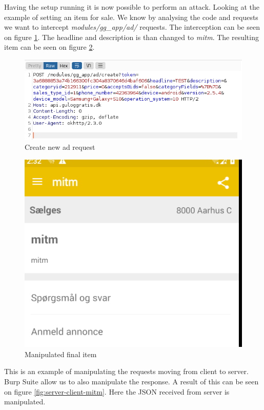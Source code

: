 Having the setup running it is now possible to perform an attack. Looking at the example of setting an item for sale. We know by analysing the code and requests we want to intercept \textit{modules/gg\_app/ad/} requests. The interception can be seen on figure \ref{fig:attack-new-ad}. The headline and description is than changed to \textit{mitm}. The resulting item can be seen on figure \ref{fig:attack-final-ad}.  

\begin{figure}[htbp]
    \centering
    \includegraphics[width=1\columnwidth]{../dynamic-analysis/pictures/MITM-auction-burp.png}
    \caption{Create new ad request}
    \label{fig:attack-new-ad}
\end{figure}

\begin{figure}[htbp]
    \centering
    \includegraphics[width=0.5\columnwidth]{../dynamic-analysis/pictures/mitm_auction.png}
    \caption{Manipulated final item}
    \label{fig:attack-final-ad}
\end{figure}

This is an example of manipulating the requests moving from client to server. Burp Suite allow us to also manipulate the response. A result of this can be seen on figure \ref{fig:server-client-mitm}. Here the JSON received from server is manipulated.  

